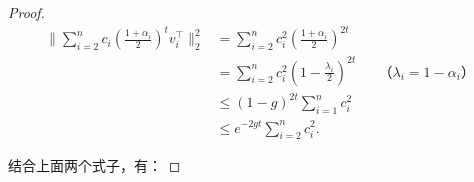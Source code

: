 \begin{proof}
    \begin{align*}
        \lVert \sum_{i=2}^n{c_i\left(\frac{1+\alpha_i}{2}\right)^tv_i^{\top}}\rVert_2^2&=\sum_{i=2}^n{c_i^2\left(\frac{1+\alpha_i}{2}\right)^{2t}}\\
        &=\sum_{i=2}^n{c_i^2\left(1-\frac{\lambda_i}{2}\right)^{2t}}&&\text{（$\lambda_i=1-\alpha_i$）}\\
        &\le (1-g)^{2t}\sum_{i=1}^n{c_i^2}\\
        &\le e^{-2gt}\sum_{i=2}^n{c_i^2}.
    \end{align*}

    结合上面两个式子，有：
    

\end{proof}
